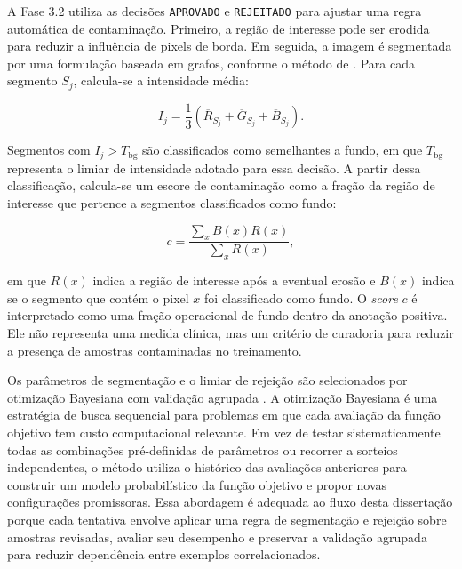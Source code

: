 A Fase 3.2 utiliza as decisões \texttt{APROVADO} e \texttt{REJEITADO} para
ajustar uma regra automática de contaminação. Primeiro, a região de interesse
pode ser erodida para reduzir a influência de pixels de borda. Em seguida, a
imagem é segmentada por uma formulação baseada em grafos, conforme o método de
\textcite{felzenszwalb2004efficient}. Para cada segmento $S_j$, calcula-se a
intensidade média:

\begin{equation}
    I_j =
    \frac{1}{3}
    \left(
    \overline{R}_{S_j} + \overline{G}_{S_j} + \overline{B}_{S_j}
    \right).
    \label{eq:intensidade_segmento}
\end{equation}

Segmentos com $I_j>T_{\mathrm{bg}}$ são classificados como semelhantes a fundo,
em que $T_{\mathrm{bg}}$ representa o limiar de intensidade adotado para essa
decisão. A partir dessa classificação, calcula-se um escore de contaminação
como a fração da região de interesse que pertence a segmentos classificados como
fundo:

\begin{equation}
    c = \frac{\sum_x B(x)R(x)}{\sum_x R(x)} ,
    \label{eq:contaminacao}
\end{equation}

em que $R(x)$ indica a região de interesse após a eventual erosão e $B(x)$
indica se o segmento que contém o pixel $x$ foi classificado como fundo. O \textit{score}
$c$ é interpretado como uma fração operacional de fundo dentro da anotação
positiva. Ele não representa uma medida clínica, mas um critério de curadoria
para reduzir a presença de amostras contaminadas no treinamento.

Os parâmetros de segmentação e o limiar de rejeição são selecionados por
otimização Bayesiana com validação agrupada
\cite{snoek2012practical,roberts2017crossvalidation}. A otimização Bayesiana é
uma estratégia de busca sequencial para problemas em que cada avaliação da função
objetivo tem custo computacional relevante. Em vez de testar sistematicamente todas as combinações pré-definidas de
parâmetros ou recorrer a sorteios independentes, o método utiliza o histórico das avaliações anteriores para construir um modelo probabilístico da
função objetivo e propor novas configurações promissoras. Essa abordagem é
adequada ao fluxo desta dissertação porque cada tentativa envolve aplicar uma
regra de segmentação e rejeição sobre amostras revisadas, avaliar seu desempenho
e preservar a validação agrupada para reduzir dependência entre exemplos
correlacionados.


